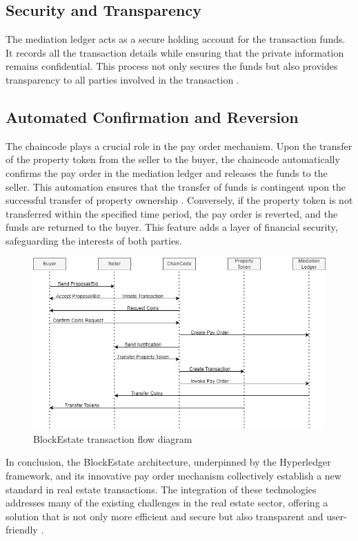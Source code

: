 \documentclass[3p,times]{elsarticle}
\begin{document}
\subsection{Security and Transparency}
The mediation ledger acts as a secure holding account for the transaction funds. It records all the transaction details while ensuring that the private information remains confidential. This process not only secures the funds but also provides transparency to all parties involved in the transaction \cite{sladic2021blockchain}.

\subsection{Automated Confirmation and Reversion}
The chaincode plays a crucial role in the pay order mechanism. Upon the transfer of the property token from the seller to the buyer, the chaincode automatically confirms the pay order in the mediation ledger and releases the funds to the seller. This automation ensures that the transfer of funds is contingent upon the successful transfer of property ownership \cite{mashatan2021usurping}. Conversely, if the property token is not transferred within the specified time period, the pay order is reverted, and the funds are returned to the buyer. This feature adds a layer of financial security, safeguarding the interests of both parties.

\begin{figure}[H]
    \centering
    \includegraphics[width=1\linewidth]{images/state flow diagram.drawio.png}
    \caption{BlockEstate transaction flow diagram}
    \label{fig:fig2}
\end{figure}

In conclusion, the BlockEstate architecture, underpinned by the Hyperledger framework, and its innovative pay order mechanism collectively establish a new standard in real estate transactions. The integration of these technologies addresses many of the existing challenges in the real estate sector, offering a solution that is not only more efficient and secure but also transparent and user-friendly \cite{harris2021blockchain}.
\end{document}
